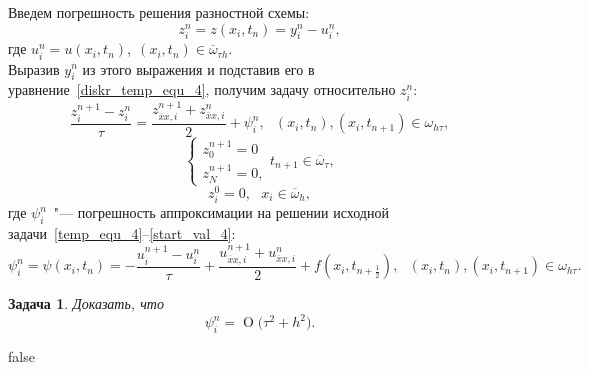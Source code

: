 \documentclass[11pt,a4paper,twoside]{report}
\numberwithin{equation}{section}
\newtheorem*{problem}{Задача}
\theoremstyle{definition}
\theoremstyle{plain}
\newcommand{\bigO}[1]{\ensuremath{\operatorname{O}\bigl(#1\bigr)}}
\begin{document}
Введем погрешность решения разностной схемы:
%
$$
    z_i^n = z(x_i, t_n) = y_i^n - u_i^n,
$$
%
где $u_i^n = u(x_i, t_n),\;(x_i, t_n) \in \overline{\omega}_{\tau h}.$\\
Выразив $y_i^n$ из этого выражения и подставив его в уравнение~\eqref{diskr_temp_equ_4},
получим задачу относительно $z_i^n$:
\begin{equation}
    \label{z_eq_4}
    \frac{z_i^{n+1} - z_i^n}{\tau} = \frac{z^{n+1}_{\overline{x}x,i} +
    z^{n}_{\overline{x}x,i}}{2} + \psi_i^n,~~~(x_i, t_n), (x_i, t_{n+1})\in \omega_{h\tau},
\end{equation}
%
\begin{equation}
    \label{z_board_4}
    \begin{cases}
        z_0^{n+1} = 0 \\
        z_N^{n+1} = 0,
    \end{cases}
    t_{n+1}\in \overline{\omega}_{\tau},
\end{equation}
%
\begin{equation}
    \label{z_start_4}
    z_i^0 = 0,~~~x_i\in \overline{\omega}_h,
\end{equation}
%
где $\psi_i^n$~"--- погрешность аппроксимации на решении исходной
задачи~\eqref{temp_equ_4}--\eqref{start_val_4}:
%
\begin{equation}
%
    \label{approx_temp_4}
    \psi_i^n = \psi(x_i, t_n) = -\frac{u_i^{n+1} - u_i^n}{\tau} + \frac{u^{n+1}_{\overline{x}x,i}
    + u^{n}_{\overline{x}x,i}}{2} + f(x_i, t_{n+\frac{1}{2}}),
    ~~~(x_i, t_n), (x_i, t_{n+1})\in \omega_{h\tau}.
%
\end{equation}
%
\begin{problem}
%
    Доказать, что
    \begin{equation}
        \label{eq:problemeq2}
        \psi_i^n = \bigO{\tau^2 + h^2}.
    \end{equation}
%
\end{problem}
%
\ifx false
%
\end{document}
